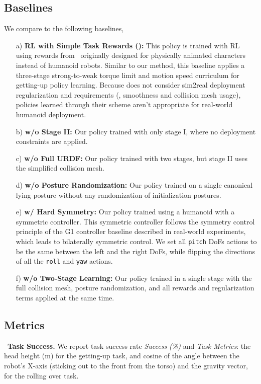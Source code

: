 \subsection{Baselines} We compare to the following baselines,
\begin{itemize}
    \item[a)] \textbf{RL with Simple Task Rewards (\citet{Learning2GetUp22}):} 
    This policy is trained with RL using rewards from~\citet{Learning2GetUp22} originally designed for physically animated characters instead of humanoid robots.
    Similar to our method, this baseline applies a three-stage strong-to-weak torque limit and motion speed curriculum for getting-up policy learning.
    Because \cite{Learning2GetUp22} does not consider sim2real deployment regularization and requirements (\eg, smoothness and collision mesh usage), policies learned through their scheme aren't appropriate for real-world humanoid deployment.
    \item[b)] \textbf{\ours w/o Stage II:} 
    Our policy trained with only stage I, where no deployment constraints are applied.
    \item[c)] \textbf{\ours w/o Full URDF:} 
    Our policy trained with two stages, but stage II uses the simplified collision mesh.
    \item[d)] \textbf{\ours w/o Posture Randomization:} 
    Our policy trained on a single canonical lying posture without any randomization of initialization postures.
    \item[e)] \textbf{\ours w/ Hard Symmetry:}
    Our policy trained using a humanoid with a symmetric controller.
    This symmetric controller follows the symmetry control principle of the G1 controller baseline described in real-world experiments, which leads to bilaterally symmetric control.
    We set all \texttt{pitch} DoFs actions to be the same between the left and the right DoFs, while flipping the directions of all the \texttt{roll} and \texttt{yaw} actions.
    \item[f)] \textbf{\ours w/o Two-Stage Learning:}
    Our policy trained in a single stage with the full collision mesh, posture randomization, and all rewards and regularization terms applied at the same time.
\end{itemize}

\subsection{Metrics}\label{sec:metrics}
\noindent \textbullet~\textbf{Task Success.} We report task success rate \textit{Success (\%)} and \textit{Task Metrics}: the head height (m) for the getting-up task, and cosine of the angle between the robot's X-axis (sticking out to the front from the torso) and the gravity vector, for the rolling over task.

